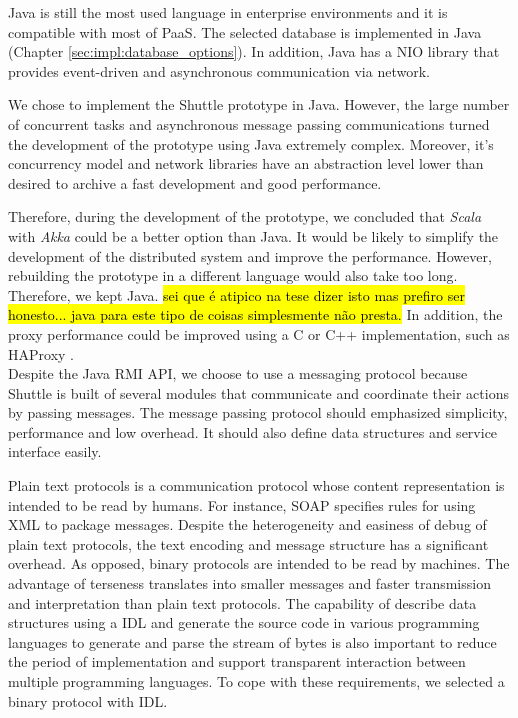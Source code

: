 Java is still the most used language in enterprise environments and it is compatible with most of \ac{PaaS}. The selected database is implemented in Java (Chapter \ref{sec:impl:database_options}). In addition, Java has a \acf{NIO} library that provides event-driven and asynchronous communication via network. %

We chose to implement the Shuttle prototype in Java. However, the large number of concurrent tasks and asynchronous message passing communications turned the development of the prototype using Java extremely complex. Moreover, it's concurrency model and network libraries have an abstraction level lower than desired to archive a fast development and good performance.

Therefore, during the development of the prototype, we concluded that \emph{Scala} with \emph{Akka} could be a better option than Java. It would be likely to simplify the development of the distributed system and improve the performance. However, rebuilding the prototype in a different language would also take too long. Therefore, we kept Java. \hl{sei que é atipico na tese dizer isto mas prefiro ser honesto... java para este tipo de coisas simplesmente não presta.}
In addition, the proxy performance could be improved using a C or C++ implementation, such as HAProxy \cite{haproxy}. \\

Despite the Java \acf{RMI} \ac{API}, we choose to use a messaging protocol because Shuttle is built of several modules that communicate and coordinate their actions by passing messages. The message passing protocol should emphasized simplicity, performance and low overhead. It should also define data structures and service interface easily. 

Plain text protocols is a communication protocol whose content representation is intended to be read by humans. For instance, \acf{SOAP} \cite{soap} specifies rules for using XML to package messages. Despite the heterogeneity and easiness of debug of plain text protocols, the text encoding and message structure has a significant overhead. As opposed, binary protocols are intended to be read by machines. The advantage of terseness translates into smaller messages and faster transmission and interpretation than plain text protocols. The capability of describe data structures using a \acf{IDL} and generate the source code in various programming languages to generate and parse the stream of bytes is also important to reduce the period of implementation and support transparent interaction between multiple programming languages. To cope with these requirements, we selected a binary protocol with \ac{IDL}. 

